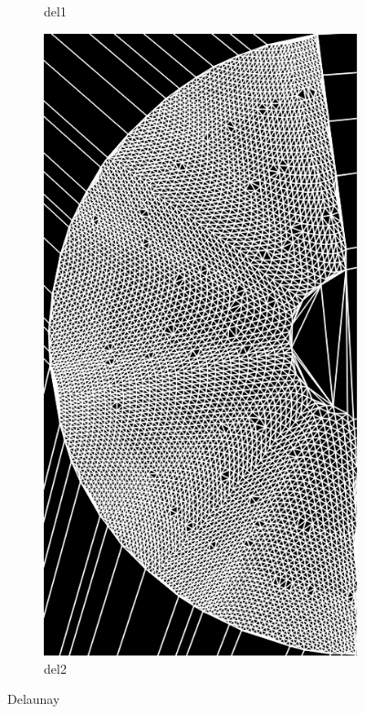 \begin{figure}[!htb]
\begin{subfigure}{.9\textwidth}
		\caption{del1}
	\end{subfigure}
	\begin{subfigure}{.9\textwidth}
		\centering
		\includegraphics[angle=-90, width=.8\textwidth]{images/delaunay2.png}
		\caption{del2}
	\end{subfigure}
	\label{fig:delaunay}
	\caption{Delaunay}
\end{figure}